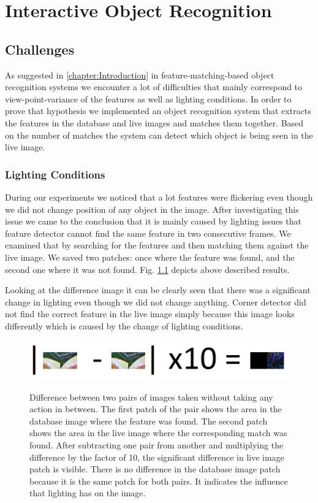 \chapter{Interactive Object Recognition}
\label{chapter:Object Recognition}

\section{Challenges}
As suggested in \ref{chapter:Introduction} in feature-matching-based object recognition systems we encounter a lot of difficulties that mainly correspond to view-point-variance of the features as well as lighting conditions. In order to prove that hypothesis we implemented an object recognition system that extracts the features in the database and live images and matches them together. Based on the number of matches the system can detect which object is being seen in the live image.

\subsection{Lighting Conditions}

During our experiments we noticed that a lot features were flickering even though we did not change position of any object in the image. After investigating this issue we came to the conclusion that it is mainly caused by lighting issues that feature detector cannot find the same feature in two consecutive frames. We examined that by searching for the features and then matching them against the live image. We saved two patches: once where the feature was found, and the second one where it was not found. Fig. \ref{fig:patches} depicts above described results.

Looking at the difference image it can be clearly seen that there was a significant change in lighting even though we did not change anything. Corner detector did not find the correct feature in the live image simply because this image looks differently which is caused by the change of lighting conditions.

\begin{figure}

{\includegraphics[width=1\columnwidth]{figures/patches.png}}

\caption{Difference between two pairs of images taken without taking any action in between. The first patch of the pair shows the area in the database image where the feature was found. The second patch shows the area in the live image where the corresponding match was found. After subtracting one pair from another and multiplying the difference by the factor of 10, the significant difference in live image patch is visible. There is no difference in the database image patch because it is the same patch for both pairs.  It indicates the influence that lighting has on the image. }
\label{fig:patches}
\end{figure}

